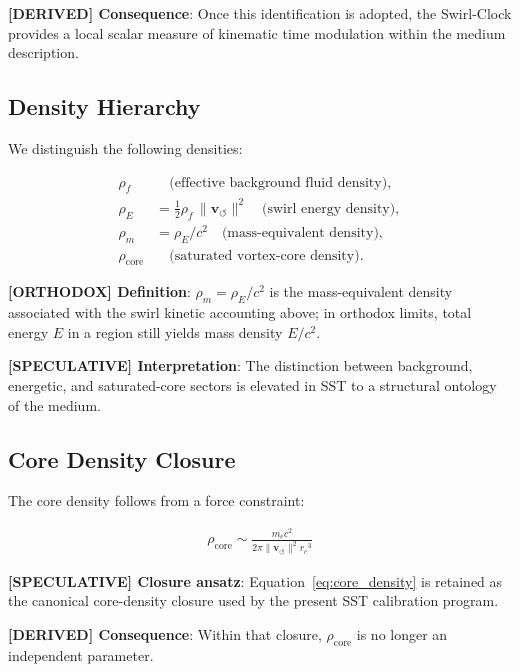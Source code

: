 \documentclass[11pt]{article}
\theoremstyle{definition}
\theoremstyle{plain}
\theoremstyle{remark}
\newcommand{\rhoF}{{\rho_{\!f}}}
\newcommand{\rhoE}{\rho_{\!E}}
\newcommand{\rhoM}{\rho_{\!m}}
\newcommand{\rhocore}{\rho_{\mathrm{core}}}
\newcommand{\rc}{{r_c}}
\newcommand{\vnorm}{\lVert \mathbf{v}_{\!\boldsymbol{\circlearrowleft}} \rVert}
\begin{document}
        \textbf{[DERIVED] Consequence}: Once this identification is adopted, the Swirl-Clock provides a local scalar measure of kinematic time modulation within the medium description.
    
    \subsection{Density Hierarchy}
        
        We distinguish the following densities:
        
        \begin{align}
            \rhoF &\quad \text{(effective background fluid density)}, \\
            \rhoE &= \tfrac12 \rhoF \, \vnorm^2 \quad \text{(swirl energy density)}, \\
            \rhoM &= \rhoE / c^2 \quad \text{(mass-equivalent density)}, \\
            \rhocore &\quad \text{(saturated vortex-core density)}.
        \end{align}

        \textbf{[ORTHODOX] Definition}: $\rhoM=\rhoE/c^2$ is the mass-equivalent density associated with the swirl kinetic accounting above; in orthodox limits, total energy $E$ in a region still yields mass density $E/c^2$.

        \textbf{[SPECULATIVE] Interpretation}: The distinction between background, energetic, and saturated-core sectors is elevated in SST to a structural ontology of the medium.
    
    \subsection{Core Density Closure}
        
        The core density follows from a force constraint:
        
        \begin{align}
            \rhocore \sim \frac{m_e c^2}{2\pi \vnorm^2 \rc^3}
            \label{eq:core_density}
        \end{align}
        
        \textbf{[SPECULATIVE] Closure ansatz}: Equation~\eqref{eq:core_density} is retained as the canonical core-density closure used by the present SST calibration program.

        \textbf{[DERIVED] Consequence}: Within that closure, $\rhocore$ is no longer an independent parameter.
\end{document}
